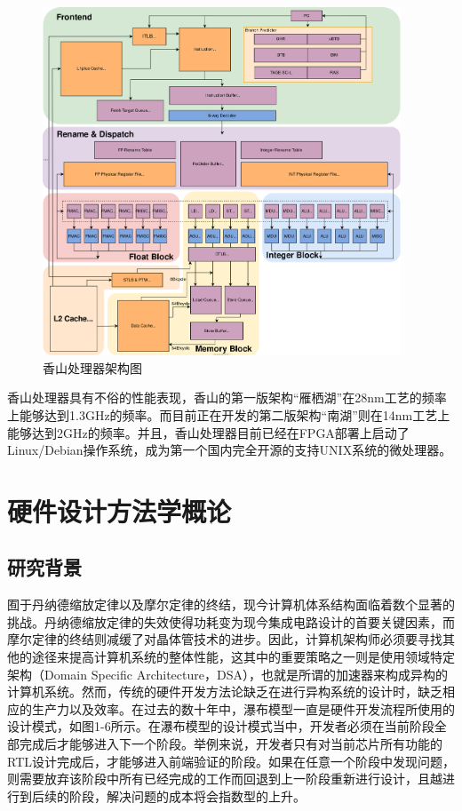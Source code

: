 \begin{figure}[htbp]
	\centering
	\includegraphics[width=0.95\textwidth]{Photos/xs-arch-simple.png}
	\caption{香山处理器架构图}
\end{figure}

香山处理器具有不俗的性能表现，香山的第一版架构“雁栖湖”在28nm工艺的频率上能够达到1.3GHz的频率。而目前正在开发的第二版架构“南湖”则在14nm工艺上能够达到2GHz的频率。并且，香山处理器目前已经在FPGA部署上启动了Linux/Debian操作系统，成为第一个国内完全开源的支持UNIX系统的微处理器。

\section{硬件设计方法学概论}
\subsection{研究背景}

囿于丹纳德缩放定律以及摩尔定律的终结，现今计算机体系结构面临着数个显著的挑战。丹纳德缩放定律的失效使得功耗变为现今集成电路设计的首要关键因素，而摩尔定律的终结则减缓了对晶体管技术的进步。因此，计算机架构师必须要寻找其他的途径来提高计算机系统的整体性能，这其中的重要策略之一则是使用领域特定架构（Domain Specific Architecture，DSA），也就是所谓的加速器来构成异构的计算机系统。然而，传统的硬件开发方法论缺乏在进行异构系统的设计时，缺乏相应的生产力以及效率。在过去的数十年中，瀑布模型一直是硬件开发流程所使用的设计模式，如图1-6所示。在瀑布模型的设计模式当中，开发者必须在当前阶段全部完成后才能够进入下一个阶段。举例来说，开发者只有对当前芯片所有功能的RTL设计完成后，才能够进入前端验证的阶段。如果在任意一个阶段中发现问题，则需要放弃该阶段中所有已经完成的工作而回退到上一阶段重新进行设计，且越进行到后续的阶段，解决问题的成本将会指数型的上升。

